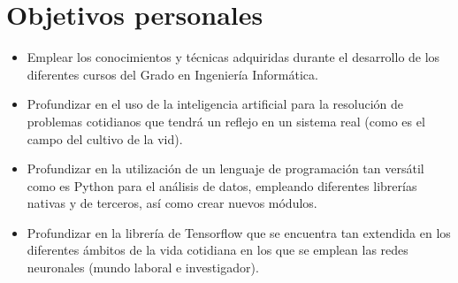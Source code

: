 \section{Objetivos personales}
\begin{itemize}
    \item Emplear los conocimientos y técnicas adquiridas durante el desarrollo de los diferentes
        cursos del Grado en Ingeniería Informática.
    \item Profundizar en el uso de la inteligencia artificial para la resolución de 
        problemas cotidianos que tendrá un reflejo en un sistema real (como es el
        campo del cultivo de la vid).
    \item Profundizar en la utilización de un lenguaje de programación tan versátil
        como es Python para el análisis de datos, empleando diferentes librerías
        nativas y de terceros, así como crear nuevos módulos.
    \item Profundizar en la librería de Tensorflow que se encuentra tan extendida
        en los diferentes ámbitos de la vida cotidiana en los que se emplean las redes 
        neuronales (mundo laboral e investigador). 
\end{itemize}